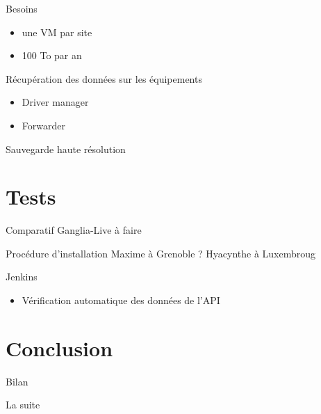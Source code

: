 \documentclass{beamer}
\begin{document}
\begin{frame}{Besoins}
\begin{itemize}
  \item une VM par site
  \item 100 To par an   
\end{itemize}


\end{frame}

\begin{frame}{Récupération des données sur les équipements}

\begin{itemize}
  \item Driver manager
  \item Forwarder
\end{itemize}
\end{frame}

\begin{frame}{Sauvegarde haute résolution}
    
\end{frame}

\section{Tests}

\begin{frame}{Comparatif Ganglia-Live}
à faire
\end{frame}

\begin{frame}{Procédure d'installation}
Maxime à Grenoble ?
Hyacynthe à Luxembroug
\end{frame}



\begin{frame}{Jenkins}
\begin{itemize}
  \item Vérification automatique des données de l'API
\end{itemize}
\end{frame}


\section{Conclusion}

\begin{frame}{Bilan}

\end{frame}

\begin{frame}{La suite}


\end{frame}
\end{document}
